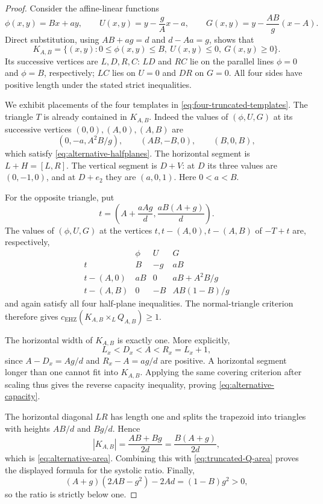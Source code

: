 \begin{proof}
Consider the affine-linear functions
\[
 \phi(x,y)=Bx+ay,\qquad
 U(x,y)=y-\frac gA x-a,\qquad
 G(x,y)=y-\frac{AB}{g}(x-A).
\]
Direct substitution, using $AB+ag=d$ and $d-Aa=g$, shows that
\begin{equation}\label{eq:alternative-halfplanes}
 K_{A,B}=\{(x,y):0\leq\phi(x,y)\leq B,\ U(x,y)\leq0,\ G(x,y)\geq0\}.
\end{equation}
Its successive vertices are $L,D,R,C$: $LD$ and $RC$ lie on the
parallel lines $\phi=0$ and $\phi=B$, respectively; $LC$ lies on
$U=0$ and $DR$ on $G=0$. All four sides have positive length under
the stated strict inequalities.

We exhibit placements of the four templates in
\eqref{eq:four-truncated-templates}. The triangle $T$ is already contained
in $K_{A,B}$. Indeed the values of $(\phi,U,G)$ at its successive vertices
$(0,0),(A,0),(A,B)$ are
\[
 (0,-a,A^2B/g),\qquad (AB,-B,0),\qquad (B,0,B),
\]
which satisfy \eqref{eq:alternative-halfplanes}. The horizontal segment
is $L+H=[L,R]$. The vertical segment is $D+V$: at $D$ its three values
are $(0,-1,0)$, and at $D+e_2$ they are $(a,0,1)$. Here $0<a<B$.

For the opposite triangle, put
\[
 t=\left(A+\frac{aAg}{d},\frac{aB(A+g)}d\right).
\]
The values of $(\phi,U,G)$ at the vertices
$t,t-(A,0),t-(A,B)$ of $-T+t$ are, respectively,
\[
 \begin{array}{c|ccc}
 &\phi&U&G\\ \hline
 t&B&-g&aB\\
 t-(A,0)&aB&0&aB+A^2B/g\\
 t-(A,B)&0&-B&AB(1-B)/g
 \end{array}
\]
and again satisfy all four half-plane inequalities. The normal-triangle
criterion therefore gives $c_{\mathrm{EHZ}}(K_{A,B}\times_L Q_{A,B})\geq1$.

The horizontal width of $K_{A,B}$ is exactly one. More explicitly,
\[
 L_x<D_x<A<R_x=L_x+1,
\]
since $A-D_x=Ag/d$ and $R_x-A=ag/d$ are positive.
A horizontal segment longer than one cannot fit into $K_{A,B}$.
Applying the same covering criterion after scaling thus gives the reverse
capacity inequality, proving \eqref{eq:alternative-capacity}.

The horizontal diagonal $LR$ has length one and splits the trapezoid
into triangles with heights $AB/d$ and $Bg/d$. Hence
\[
 |K_{A,B}|=\frac{AB+Bg}{2d}=\frac{B(A+g)}{2d},
\]
which is \eqref{eq:alternative-area}. Combining this with
\eqref{eq:truncated-Q-area} proves the displayed formula for the systolic
ratio. Finally,
\[
 (A+g)(2AB-g^2)-2Ad=(1-B)g^2>0,
\]
so the ratio is strictly below one.
\end{proof}

